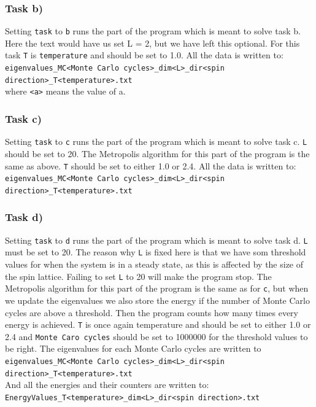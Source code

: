 \documentclass{article}
\begin{document}
\subsubsection*{Task b)}
Setting \texttt{task} to \texttt{b} runs the part of the program which is meant to solve task b. Here the text would have us set L = 2, but we have left this optional. For this task \texttt{T} is \texttt{temperature} and should be set to 1.0. All the data is written to: \\
\texttt{eigenvalues\_MC<Monte Carlo cycles>\_dim<L>\_dir<spin direction>\_T<temperature>.txt}  \\
where \texttt{<a>} means the value of a.
\subsubsection*{Task c)}
Setting \texttt{task} to \texttt{c} runs the part of the program which is meant to solve task c. \texttt{L} should be set to 20. The Metropolis algorithm for this part of the program is the same as above. \texttt{T} should be set to either 1.0 or 2.4. All the data is written to: \\
\texttt{eigenvalues\_MC<Monte Carlo cycles>\_dim<L>\_dir<spin direction>\_T<temperature>.txt} 
\subsubsection*{Task d)}
Setting \texttt{task} to \texttt{d} runs the part of the program which is meant to solve task d. \texttt{L} must be set to 20. The reason why \texttt{L} is fixed here is that we have som threshold values for when the system is in a steady state, as this is affected by the size of the spin lattice. Failing to set \texttt{L} to 20 will make the program stop. The Metropolis algorithm for this part of the program is the same as for \texttt{c}, but when we update the eigenvalues we also store the energy if the number of Monte Carlo cycles are above a threshold. Then the program counts how many times every energy is achieved. \texttt{T} is once again temperature and should be set to either 1.0 or 2.4 and \texttt{Monte Caro cycles} should be set to 1000000 for the threshold values to be right. The eigenvalues for each Monte Carlo cycles are written to \\
\texttt{eigenvalues\_MC<Monte Carlo cycles>\_dim<L>\_dir<spin direction>\_T<temperature>.txt}  \\
And all the energies and their counters are written to: \\
\texttt{EnergyValues\_T<temperature>\_dim<L>\_dir<spin direction>.txt}
\end{document}
